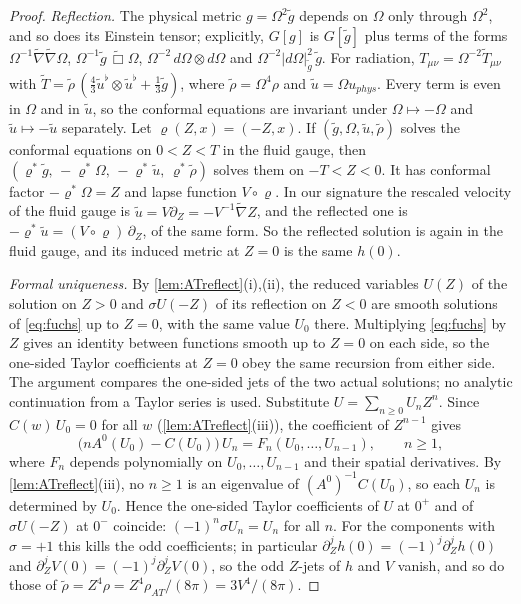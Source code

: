 \documentclass[11pt]{article}
\theoremstyle{canonmath}
\theoremstyle{canonpostulate}
\theoremstyle{canonproposition}
\theoremstyle{canonmath}
\theoremstyle{canonproposition}
\def\mathrm#1{#1}%
\def\mathbf#1{#1}%
\begin{document}
\begin{proof}
\emph{Reflection.} The physical metric $g = \Omega^2\tilde g$ depends on $\Omega$ only through $\Omega^2$, and so does its Einstein tensor; explicitly, $G[g]$ is $G[\tilde g]$ plus terms of the forms $\Omega^{-1}\tilde\nabla\tilde\nabla\Omega$, $\Omega^{-1}\tilde g\,\tilde\Box\Omega$, $\Omega^{-2}\,d\Omega\otimes d\Omega$ and $\Omega^{-2}|d\Omega|^2_{\tilde g}\,\tilde g$. For radiation, $T_{\mu\nu} = \Omega^{-2}\tilde T_{\mu\nu}$ with $\tilde T = \tilde\rho\,(\tfrac43\tilde u^\flat\otimes\tilde u^\flat + \tfrac13\tilde g)$, where $\tilde\rho = \Omega^4\rho$ and $\tilde u = \Omega u_{\mathrm{phys}}$. Every term is even in $\Omega$ and in $\tilde u$, so the conformal equations are invariant under $\Omega\mapsto-\Omega$ and $\tilde u\mapsto-\tilde u$ separately. Let $\varrho(Z,x) = (-Z,x)$. If $(\tilde g,\Omega,\tilde u,\tilde\rho)$ solves the conformal equations on $0<Z<T$ in the fluid gauge, then $(\varrho^*\tilde g,\,-\varrho^*\Omega,\,-\varrho^*\tilde u,\,\varrho^*\tilde\rho)$ solves them on $-T<Z<0$. It has conformal factor $-\varrho^*\Omega = Z$ and lapse function $V\circ\varrho$. In our signature the rescaled velocity of the fluid gauge is $\tilde u = V\partial_Z = -V^{-1}\tilde\nabla Z$, and the reflected one is $-\varrho^*\tilde u = (V\circ\varrho)\,\partial_Z$, of the same form. So the reflected solution is again in the fluid gauge, and its induced metric at $Z=0$ is the same $h(0)$.

\emph{Formal uniqueness.} By \cref{lem:ATreflect}(i),(ii), the reduced variables $\mathbf{U}(Z)$ of the solution on $Z>0$ and $\sigma \mathbf{U}(-Z)$ of its reflection on $Z<0$ are smooth solutions of \eqref{eq:fuchs} up to $Z = 0$, with the same value $\mathbf{U}_0$ there. Multiplying \eqref{eq:fuchs} by $Z$ gives an identity between functions smooth up to $Z = 0$ on each side, so the one-sided Taylor coefficients at $Z=0$ obey the same recursion from either side. The argument compares the one-sided jets of the two actual solutions; no analytic continuation from a Taylor series is used. Substitute $\mathbf{U} = \sum_{n\ge0}\mathbf{U}_nZ^n$. Since $C(w)\,\mathbf{U}_0 = 0$ for all $w$ (\cref{lem:ATreflect}(iii)), the coefficient of $Z^{n-1}$ gives
\[
\bigl(nA^0(\mathbf{U}_0) - C(\mathbf{U}_0)\bigr)\,\mathbf{U}_n = F_n(\mathbf{U}_0,\dots,\mathbf{U}_{n-1}), \qquad n\ge1,
\]
where $F_n$ depends polynomially on $\mathbf{U}_0,\dots,\mathbf{U}_{n-1}$ and their spatial derivatives. By \cref{lem:ATreflect}(iii), no $n\ge1$ is an eigenvalue of $(A^0)^{-1}C(\mathbf{U}_0)$, so each $\mathbf{U}_n$ is determined by $\mathbf{U}_0$. Hence the one-sided Taylor coefficients of $\mathbf{U}$ at $0^+$ and of $\sigma \mathbf{U}(-Z)$ at $0^-$ coincide: $(-1)^n\sigma \mathbf{U}_n = \mathbf{U}_n$ for all $n$. For the components with $\sigma = +1$ this kills the odd coefficients; in particular $\partial_Z^jh(0) = (-1)^j\partial_Z^jh(0)$ and $\partial_Z^jV(0) = (-1)^j\partial_Z^jV(0)$, so the odd $Z$-jets of $h$ and $V$ vanish, and so do those of $\tilde\rho = Z^4\rho = Z^4\rho_{\mathrm{AT}}/(8\pi) = 3V^4/(8\pi)$.


\end{proof}
\end{document}
